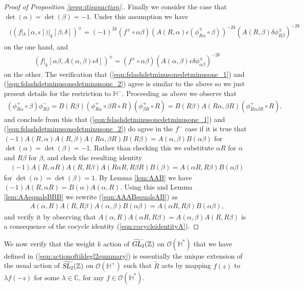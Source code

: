 \documentclass[aps,prd,groupedaddress,preprint,tightenlines,eqsecnum,nofootinbib]{revtex4}
\newcommand{\e}{\epsilon}
\newcommand{\SL}{\operatorname{\textsl{SL}}}      %
\newcommand{\GL}{\operatorname{\textsl{GL}}}      %
\newcommand{\C}{{\mathbb C}}%
\newcommand{\Z}{{\mathbb Z}}%
\newcommand{\HH}{{\mathbb H}}%
\newcommand{\WT}{\widetilde}
\newcommand{\A}{\alpha}
\newcommand{\B}{\beta}
\begin{document}
\begin{proof}[Proof of Proposition \ref{prop:itisanaction}.]
Finally we consider the case that $\det(\A)=\det(\B)=-1$. Under this assumption we have
\begin{gather}
\begin{split}\label{eqn:fslashdetminusonedetminusone_1}
((f|_k[\A,\e])|_k[\B,\delta])^\pm
=(-1)^{2k}(f^\pm\circ \A\B)(A(R,\A)\e(\phi_{R\A}^\mp\circ \B))^{-2k}(A(R,\B)\delta \phi^\pm_{R\B})^{-2k}
\end{split}
\end{gather}
on the one hand, and 
\begin{gather}\label{eqn:fslashdetminusonedetminusone_2}
(f|_k[\A\B,A(\A,\B)\e\delta])^\pm=(f^\pm\circ \A\B)(A(\A,\B)\e\delta \phi^\pm_{\A\B})^{-2k}
\end{gather} 
on the other. The verification that (\ref{eqn:fslashdetminusonedetminusone_1}) and (\ref{eqn:fslashdetminusonedetminusone_2}) agree is similar to the above so we just present details for the restriction to $\HH^-$. Proceeding as above we observe that 
\begin{gather}
(\phi^+_{R\A}\circ\B)\phi^-_{R\B}=B(R\B)(\phi^+_{R\A }\circ \B R\circ R)(\phi^+_{\B R}\circ R)=B(R\B) A(R\A,\B R)(\phi^+_{R\A\B R}\circ R),
\end{gather}
and conclude from this that (\ref{eqn:fslashdetminusonedetminusone_1}) and (\ref{eqn:fslashdetminusonedetminusone_2}) do agree in the $f^-$ case if it is true that $(-1)A(R,\A) A(R, \B)  A(R\A ,\B  R) B(R \B)=A(\A ,\B) B(\A\B)$ for $\det(\A)=\det(\B)=-1$. Rather than checking this we substitute $\A R$ for $\A$ and $R\B $ for $\B$, and check the resulting identity 
\begin{gather}\label{eqn:AAABequalsAB}
(-1)A(R,\A R) A(R, R\B)  A(R\A  R,R\B  R) B(\B)=A(\A  R,R\B) B(\A\B)
\end{gather}
for $\det(\A)=\det(\B)=1$. By Lemma \ref{lem:AAB} we have $(-1)A(R,\A R)= B(\A)A(\A,R)$. Using this and Lemma \ref{lem:AAequalsBBB} we rewrite (\ref{eqn:AAABequalsAB}) as
\begin{gather}
A(\A,R) A(R, R\B)  A(\A,\B) B(\A\B)=A(\A  R,R\B) B(\A\B),
\end{gather}
and verify it by observing that $A(\A,R)A(\A R, R\B)=A(\A, \B)A(R,R\B)$ is a consequence of the cocycle identity (\ref{eqn:cocycleidentityA}).
\end{proof}



We now verify that the weight $k$ action of $\widetilde{\GL_2}(\Z)$ on $\mathcal{O}(\HH^*)$ that we have defined in (\ref{eqn:actionoftildegl2summary}) is essentially the unique extension of the usual action of $\widetilde{\SL_2}(\Z)$ on $\mathcal{O}(\HH^+)$ such that $\WT R$ acts by mapping $f(z)$ to $\lambda f(-z)$ for some $\lambda\in \C$, for any  $f\in \mathcal{O}(\HH^*)$. 
\end{document}
